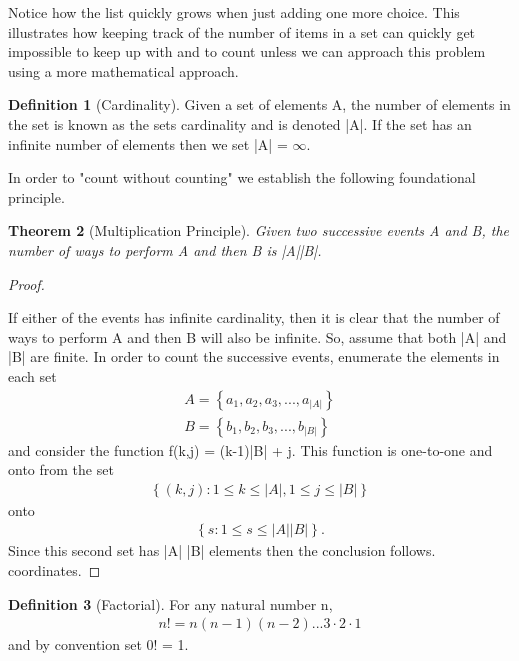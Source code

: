 \documentclass[10pt,]{book}
\theoremstyle{plain}
\newtheorem{theorem}{Theorem}[section]
\theoremstyle{definition}
\newtheorem{definition}[theorem]{Definition}
\theoremstyle{definition}
\theoremstyle{definition}
\numberwithin{equation}{section}
\begin{document}
Notice how the list quickly grows when just adding one more choice. This illustrates how keeping track of the number of items in a set can quickly get impossible to keep up with and to count unless we can approach this problem using a more mathematical approach.
%
\begin{definition}[{Cardinality}]\label{definition-14}
Given a set of elements A, the number of elements in the 
		set is known as the sets cardinality and is denoted |A|. If the set has 
		an infinite number of elements then we set |A| = \(\infty\).
		\end{definition}
\par
In order to "count without counting" we establish the following 
	foundational principle.%
\begin{theorem}[{Multiplication Principle}]\label{theorem-3}
Given two successive events A and B, the number of ways 
		to perform A and then B is |A||B|.
		\end{theorem}
\begin{proof}\hypertarget{proof-3}{}
If either of the events has infinite cardinality, then it is 
			clear
			that the number of ways to perform A and then B will also be 
			infinite. So, assume that both |A| and |B| are finite.
			In order to count the successive events, enumerate the elements in
			each set
			\begin{gather*}
A = \left \{ a_1, a_2, a_3, ... , a_{|A|} \right \}\\
B = \left \{  b_1, b_2, b_3, ... , b_{|B|} \right \}
\end{gather*}
			and consider the function f(k,j) = (k-1)|B| + j. This function is 
			one-to-one and onto from the set 
			\begin{gather*}
\left \{ (k,j): 1 \le k \le |A|, 1 \le j \le |B| \right \} 
\end{gather*} 
			onto 
			\begin{gather*}
\left \{ s : 1 \le s \le |A| |B| \right \}.
\end{gather*} 
			Since this
			second set has |A| |B| elements then the conclusion follows. 
			coordinates.%
\end{proof}
\begin{definition}[{Factorial}]\label{definition-15}
For any natural number n, 
		\begin{gather*}
n! = n(n-1)(n-2) ... 3 \cdot 2 \cdot 1
\end{gather*}
		and by convention set 0! = 1.
\end{definition}
\end{document}
